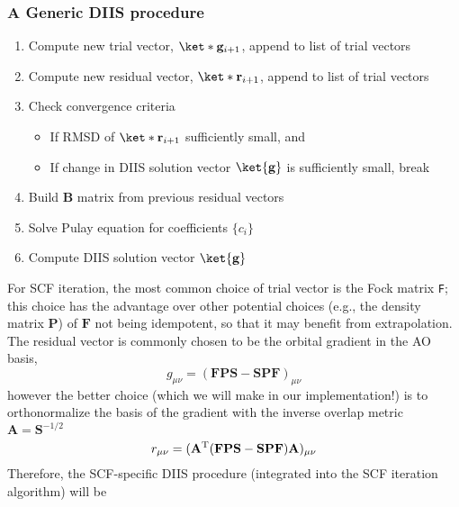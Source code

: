 \documentclass[11pt]{article}
\begin{document}
\subsubsection{A Generic DIIS procedure}
\begin{enumerate}
	\item  Compute new trial vector, $\ket*{\mathbf{g}_{i+1}}$, append to list of trial vectors
	\item  Compute new residual vector, $\ket*{\mathbf{r}_{i+1}}$, append to list of trial vectors
	\item  Check convergence criteria
	\begin{itemize}
		\item  If RMSD of $\ket*{\mathbf{r}_{i+1}}$ sufficiently small, and
		\item  If change in DIIS solution vector $\ket{\mathbf{g}}$ is sufficiently small, break
	\end{itemize}
	\item  Build $\mathbf{B}$ matrix from previous residual vectors
	\item  Solve Pulay equation for coefficients $\{c_i\}$
	\item  Compute DIIS solution vector $\ket{\mathbf{g}}$
\end{enumerate}
For SCF iteration, the most common choice of trial vector is the Fock matrix \verb|F|; this choice has the advantage over other potential choices (e.g., the density matrix $\mathbf{P}$) of $\mathbf{F}$ not being idempotent, so that it may benefit from extrapolation.  The residual vector is commonly chosen to be the orbital gradient in the AO basis,
\[g_{\mu\nu} = (\mathbf{F}\mathbf{P}\mathbf{S} -  \mathbf{S}\mathbf{P}\mathbf{F})_{\mu\nu}\]
however the better choice (which we will make in our implementation!) is to orthonormalize the basis of the gradient with the inverse overlap metric ${\mathbf{A}} = {\mathbf{S}}^{-1/2}$
\[r_{\mu\nu} = ({\mathbf{A}}^{\rm T}(\mathbf{F}\mathbf{P}\mathbf{S} -  \mathbf{S}\mathbf{P}\mathbf{F}){ \mathbf{A}})_{\mu\nu}\]
Therefore, the SCF-specific DIIS procedure (integrated into the SCF iteration algorithm) will be
\end{document}
